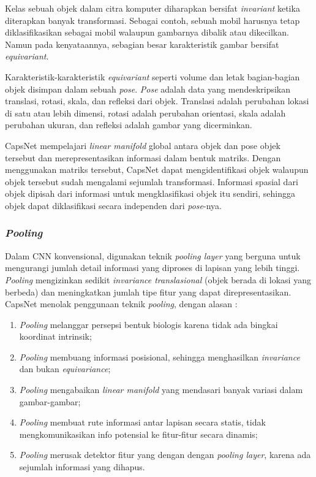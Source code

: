 \documentclass{article}
\begin{document}
	   	\par
	   	Kelas sebuah objek dalam citra komputer diharapkan bersifat \textit{invariant} ketika diterapkan banyak transformasi. Sebagai contoh, sebuah mobil harusnya tetap diklasifikasikan sebagai mobil walaupun gambarnya dibalik atau dikecilkan. Namun pada kenyataannya, sebagian besar karakteristik gambar bersifat \textit{equivariant}. 
	   	\par
	   	Karakteristik-karakteristik \textit{equivariant} seperti volume dan letak bagian-bagian objek disimpan dalam sebuah \textit{pose}. \textit{Pose} adalah data yang mendeskripsikan translasi, rotasi, skala, dan refleksi dari objek. Translasi adalah perubahan lokasi di satu atau lebih dimensi, rotasi adalah perubahan orientasi, skala adalah perubahan ukuran, dan refleksi adalah gambar yang dicerminkan. 
	   	\par
	   	CapsNet mempelajari \textit{linear manifold} global antara objek dan pose objek tersebut dan merepresentasikan informasi dalam bentuk matriks. Dengan menggunakan matriks tersebut, CapsNet dapat mengidentifikasi objek walaupun objek tersebut sudah mengalami sejumlah transformasi. Informasi spasial dari objek dipisah dari informasi untuk mengklasifikasi objek itu sendiri, sehingga objek dapat diklasifikasi secara independen dari \textit{pose}-nya.\cite{hinton_2}
	   	
	   	\subsubsection{\textit{Pooling}}
	   	Dalam CNN konvensional, digunakan teknik \textit{pooling layer} yang berguna untuk mengurangi jumlah detail informasi yang diproses di lapisan yang lebih tinggi. \textit{Pooling} mengizinkan sedikit \textit{invariance translasional} (objek berada di lokasi yang berbeda) dan meningkatkan jumlah tipe fitur yang dapat direpresentasikan. CapsNet menolak penggunaan teknik \textit{pooling}, dengan alasan :
	   	
	   	\begin{enumerate}
	   	 \item \textit{Pooling} melanggar persepsi bentuk biologis karena tidak ada bingkai koordinat intrinsik;
	   	 \item \textit{Pooling} membuang informasi posisional, sehingga menghasilkan \textit{invariance} dan bukan \textit{equivariance};
	   	 \item \textit{Pooling} mengabaikan \textit{linear manifold} yang mendasari banyak variasi dalam gambar-gambar;
	   	 \item \textit{Pooling} membuat rute informasi antar lapisan secara statis, tidak mengkomunikasikan info potensial ke fitur-fitur secara dinamis;
	   	 \item \textit{Pooling} merusak detektor fitur yang dengan dengan \textit{pooling layer}, karena ada sejumlah informasi yang dihapus.
	   	\end{enumerate}
	   	
\end{document}

